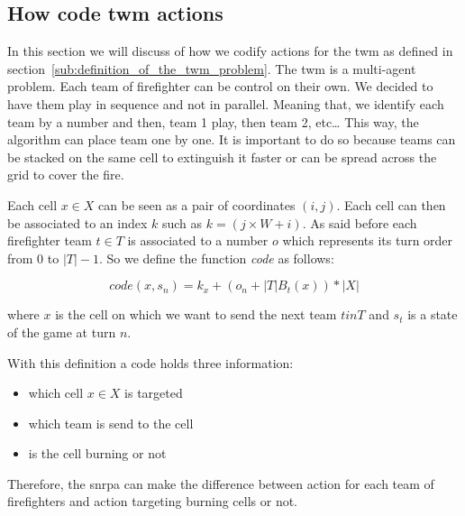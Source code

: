 \subsection{How code \acrshort{twm} actions}%
\label{sub:how_code_twm_actions}

In this section we will discuss of how we codify actions for the \gls{twm} as defined in section~\ref{sub:definition_of_the_twm_problem}.
The \gls{twm} is a multi-agent problem. 
Each team of firefighter can be control on their own.
We decided to have them play in sequence and not in parallel.
Meaning that, we identify each team by a number and then, team 1 play, then team 2, etc\dots
This way, the algorithm can place team one by one.
It is important to do so because teams can be stacked on the same cell to extinguish it faster or can be spread across the grid to cover the fire.

Each cell \(x \in X\) can be seen as a pair of coordinates \((i, j)\).
Each cell can then be associated to an index \(k\) such as \(k=(j \times W + i)\).
As said before each firefighter team \(t \in T\) is associated to a number \(o\) which represents its turn order from \(0\) to \(|T| - 1\).
So we define the function \textit{code}  as follows:

\[
    code(x, s_{n}) = k_{x} + (o_{n} + |T|B_{t}(x)) * |X|
\]

where \(x\) is the cell on which we want to send the next team \(t in T\) and \(s_{t}\) is a state of the game at turn \(n\).

With this definition a code holds three information:

\begin{itemize}
    \item which cell \(x \in X\) is targeted
    \item which team is send to the cell
    \item is the cell burning or not
\end{itemize}

Therefore, the \gls{snrpa} can make the difference between action for each team of firefighters and action targeting burning cells or not.

